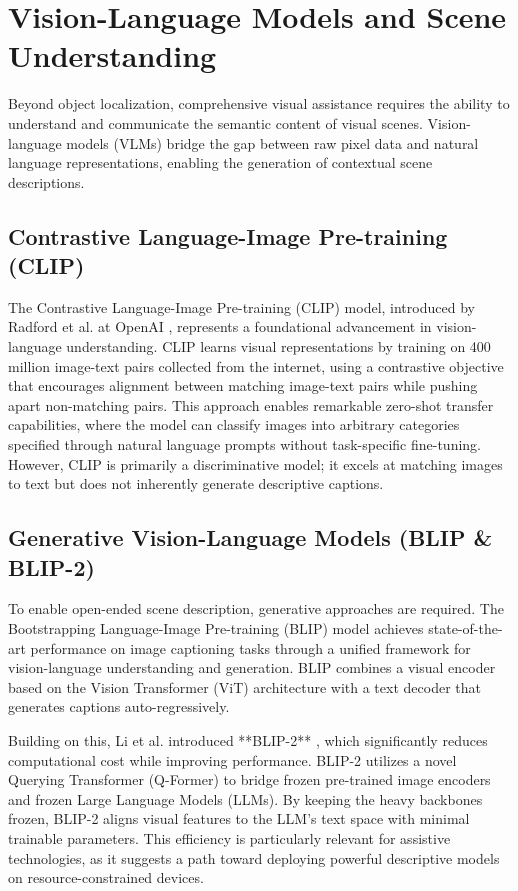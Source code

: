 \documentclass[12pt,a4paper]{report}
\begin{document}
\section{Vision-Language Models and Scene Understanding}

Beyond object localization, comprehensive visual assistance requires the ability to understand and communicate the semantic content of visual scenes. Vision-language models (VLMs) bridge the gap between raw pixel data and natural language representations, enabling the generation of contextual scene descriptions.

\subsection{Contrastive Language-Image Pre-training (CLIP)}

The Contrastive Language-Image Pre-training (CLIP) model, introduced by Radford et al. at OpenAI \cite{clip}, represents a foundational advancement in vision-language understanding. CLIP learns visual representations by training on 400 million image-text pairs collected from the internet, using a contrastive objective that encourages alignment between matching image-text pairs while pushing apart non-matching pairs. This approach enables remarkable zero-shot transfer capabilities, where the model can classify images into arbitrary categories specified through natural language prompts without task-specific fine-tuning. However, CLIP is primarily a discriminative model; it excels at matching images to text but does not inherently generate descriptive captions.

\subsection{Generative Vision-Language Models (BLIP \& BLIP-2)}

To enable open-ended scene description, generative approaches are required. The Bootstrapping Language-Image Pre-training (BLIP) model \cite{blip} achieves state-of-the-art performance on image captioning tasks through a unified framework for vision-language understanding and generation. BLIP combines a visual encoder based on the Vision Transformer (ViT) architecture \cite{vit} with a text decoder that generates captions auto-regressively.

Building on this, Li et al. introduced **BLIP-2** \cite{blip2}, which significantly reduces computational cost while improving performance. BLIP-2 utilizes a novel Querying Transformer (Q-Former) to bridge frozen pre-trained image encoders and frozen Large Language Models (LLMs). By keeping the heavy backbones frozen, BLIP-2 aligns visual features to the LLM's text space with minimal trainable parameters. This efficiency is particularly relevant for assistive technologies, as it suggests a path toward deploying powerful descriptive models on resource-constrained devices.
\end{document}
